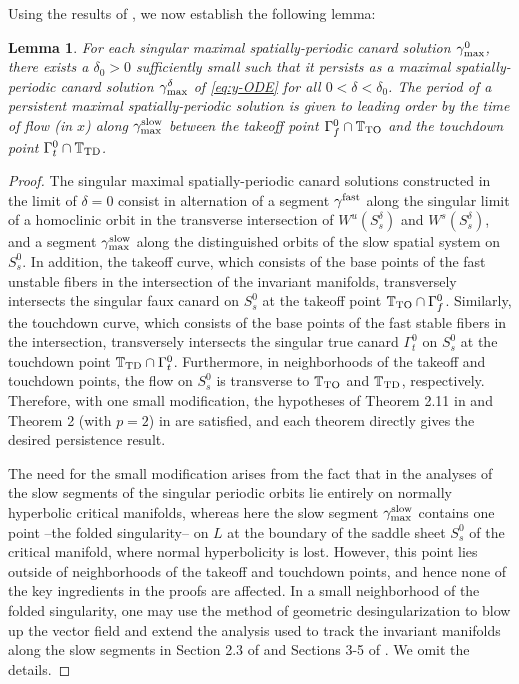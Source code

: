 \documentclass[11pt]{article}
\numberwithin{equation}{section}
\newtheorem{lemma}{Lemma}[section]
\begin{document}
Using the results of \cite{dRDR2016,ST2001}, we now establish the following lemma:

\begin{lemma} For each singular maximal spatially-periodic canard solution $\gamma^0_{\rm max}$, 
there exists a $\delta_0>0$ sufficiently small such that it persists as a maximal spatially-periodic canard solution $\gamma^\delta_{\rm max}$ of \eqref{eq:y-ODE} for all $0 < \delta < \delta_0$.
The period of a persistent maximal spatially-periodic solution is given to leading order by the time of flow (in $x$) along $\gamma^{\rm slow}_{\rm max}$ between the takeoff point $\Gamma_f^0 \cap \mathbb{T}_{\rm TO}$ and the touchdown point $\Gamma_t^0 \cap \mathbb{T}_{\rm TD}$.
\end{lemma}

\medskip
\begin{proof} 
The singular maximal spatially-periodic canard solutions constructed in the limit of $\delta = 0$ consist in alternation of a segment $\gamma^{\rm fast}$ along the singular limit of a homoclinic orbit in the transverse intersection of $W^u(S_s^\delta)$ and $W^s(S_s^\delta)$, and a segment $\gamma^{\rm slow}_{\rm max}$ along the distinguished orbits of the slow spatial system on $S_s^0$. 
In addition, the takeoff curve, which consists of the base points of the fast unstable fibers in the intersection of the invariant manifolds, transversely intersects the singular faux canard  on $S_s^0$ at the takeoff point $\mathbb{T}_{\rm TO} \cap \Gamma_f^0$.
Similarly, the touchdown curve, which consists of the base points of the fast stable fibers in the intersection, transversely intersects the singular true canard $\Gamma_t^0$ on $S_s^0$ at the touchdown point $\mathbb{T}_{\rm TD} \cap \Gamma_t^0$.
Furthermore, in neighborhoods of the takeoff and touchdown points, the flow on $S_s^0$ is transverse to $\mathbb{T}_{\rm TO}$ and $\mathbb{T}_{\rm TD}$, respectively.
Therefore, with one small modification, the hypotheses of Theorem 2.11 in \cite{dRDR2016} and Theorem 2 (with $p=2$) in \cite{ST2001} are satisfied, and each theorem directly gives the desired persistence result.

The need for the small modification arises from the fact that in the analyses of \cite{dRDR2016,ST2001} the slow segments of the singular periodic orbits  lie entirely on normally hyperbolic critical manifolds,
whereas here the slow segment $\gamma^{\rm slow}_{\rm max}$ contains one point --the folded singularity-- on $L$ at the boundary of the saddle sheet $S_s^0$ of the critical manifold, where normal hyperbolicity is lost.
However, this point lies outside of neighborhoods of the takeoff and touchdown points, and hence none of the key ingredients in the proofs are affected. 
In a small neighborhood of the folded singularity, one may use the method of geometric desingularization to blow up the vector field and extend the analysis used to track the invariant manifolds along the slow segments in Section 2.3 of \cite{dRDR2016} and Sections 3-5 of \cite{ST2001}.
We omit the details.


\end{proof}
\end{document}
